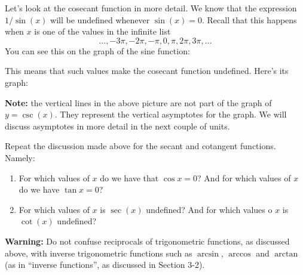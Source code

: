 \documentclass{ximera}
\begin{document}
\begin{example}
  Let's look at the cosecant function in more detail. We know that the expression $1/\sin(x)$ will be undefined whenever $\sin(x) = 0$. Recall that this happens when $x$ is one of the values in the infinite list $$   \ldots, -3\pi, -2\pi, -\pi, 0, \pi, 2\pi, 3\pi, \ldots   $$You can see this on the graph of the sine function:

  \begin{image}
\end{image}

This means that such values make the cosecant function undefined. Here's its graph:

\begin{image}
\end{image}

\begin{callout}
  {\bf Note:} the vertical lines in the above picture are not part of the graph of $y=\csc(x)$. They represent the vertical asymptotes for the graph. We will discuss asymptotes in more detail in the next couple of units.
\end{callout}

\end{example}

\begin{exploration} Repeat the discussion made above for the secant and cotangent functions. Namely:
  \begin{enumerate}[label=\alph*.]
  \item For which values of $x$ do we have that $\cos x = 0$? And for which values of $x$ do we have $\tan x = 0$?  
  \item For which values of $x$ is $\sec(x)$ undefined? And for which values o $x$ is $\cot(x)$ undefined?
  \end{enumerate}
\end{exploration}


\begin{callout}
  {\bf Warning:} Do not confuse reciprocals of trigonometric functions, as discussed above, with inverse trigonometric functions such as $\arcsin$, $\arccos$ and $\arctan$ (as in ``inverse functions'', as discussed in Section 3-2).
\end{callout}
\end{document}
